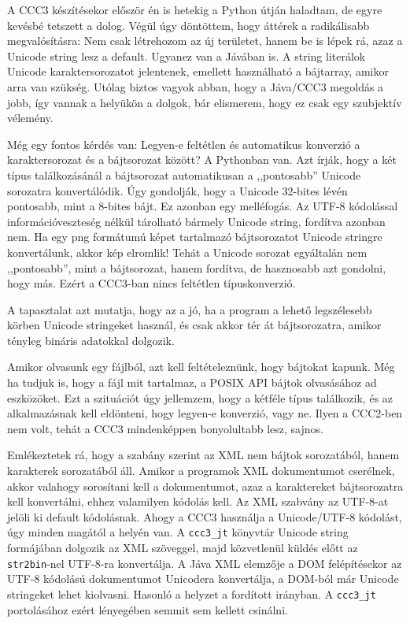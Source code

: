 A CCC3 készítésekor először én is hetekig a Python útján haladtam,
de egyre kevésbé tetszett a dolog. Végül úgy döntöttem,
hogy áttérek a radikálisabb megvalósításra: Nem csak létrehozom
az új területet, hanem be is lépek rá, azaz a Unicode string
lesz a default. Ugyanez van a Jávában is. A string literálok
Unicode karaktersorozatot jelentenek, emellett használható a
bájtarray, amikor arra van szükség. Utólag biztos vagyok
abban, hogy a Jáva/CCC3 megoldás a jobb, így vannak a helyükön
a dolgok, bár elismerem, hogy ez csak egy szubjektív vélemény.

Még egy fontos kérdés van: Legyen-e feltétlen és automatikus
konverzió a karaktersorozat és a bájtsorozat között?
A Pythonban van. Azt írják, hogy a két típus találkozásánál
a bájtsorozat automatikusan a ,,pontosabb'' Unicode sorozatra
konvertálódik. Úgy gondolják, hogy a Unicode 32-bites lévén
pontosabb, mint a 8-bites bájt. Ez azonban egy melléfogás.
Az UTF-8 kódolással információveszteség nélkül tárolható
bármely Unicode string, fordítva azonban nem.
Ha egy png formátumú képet tartalmazó bájtsorozatot
Unicode stringre konvertálunk, akkor kép elromlik!
Tehát a Unicode sorozat egyáltalán nem ,,pontosabb'', 
mint a bájtsorozat, hanem fordítva, de hasznosabb azt gondolni, 
hogy más. Ezért a CCC3-ban nincs feltétlen típuskonverzió.

A tapasztalat azt mutatja, hogy az a jó, ha a program 
a lehető legszélesebb körben Unicode stringeket használ,
és csak akkor tér át bájtsorozatra, amikor tényleg
bináris adatokkal dolgozik. 

Amikor olvasunk egy fájlból, azt kell feltételeznünk, hogy
bájtokat kapunk. Még ha tudjuk is, hogy a fájl mit tartalmaz,
a POSIX API bájtok olvasásához ad eszközöket. 
Ezt a szituációt úgy jellemzem, hogy a kétféle típus találkozik,
és az alkalmazásnak kell eldönteni, hogy legyen-e konverzió,
vagy ne. Ilyen a CCC2-ben nem volt, tehát a CCC3 mindenképpen
bonyolultabb lesz, sajnos.

Emlékeztetek rá, hogy a szabány szerint az XML nem bájtok
sorozatából, hanem karakterek sorozatából áll. Amikor a programok
XML dokumentumot cserélnek, akkor valahogy sorosítani kell
a dokumentumot, azaz a karaktereket bájtsorozatra kell
konvertálni, ehhez valamilyen kódolás kell. Az XML szabvány 
az UTF-8-at jelöli ki default kódolásnak. Ahogy a CCC3 használja 
a Unicode/UTF-8 kódolást, úgy minden magától a helyén van. 
A \verb!ccc3_jt! könyvtár Unicode string formájában dolgozik az XML 
szöveggel, majd közvetlenül küldés előtt az \verb!str2bin!-nel 
UTF-8-ra konvertálja. A Jáva XML elemzője a DOM felépítésekor
az UTF-8 kódolású dokumentumot Unicodera konvertálja, 
a DOM-ból már Unicode stringeket lehet kiolvasni.
Hasonló a helyzet a fordított irányban.
A \verb!ccc3_jt! portolásához ezért lényegében semmit sem 
kellett csinálni.

